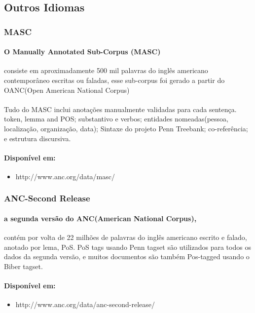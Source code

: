 \documentclass[a4paper, 10pt]{article}
\begin{document}
        \subsection{Outros Idiomas}
        	\subsubsection{MASC}
            	\paragraph{O Manually Annotated Sub-Corpus (MASC)}consiste em aproximadamente 500 mil palavras do inglês americano contemporâneo escritas ou faladas, esse sub-corpus foi gerado a partir do OANC(Open American National Corpus)
                \paragraph{}Tudo do MASC inclui anotações manualmente validadas para cada sentença. token, lemma and POS; substantivo e verbos; entidades nomeadas(pessoa, localização, organização, data); Sintaxe do projeto Penn Treebank; co-referência; e estrutura discursiva.
                
                \paragraph{Disponível em:}
                \begin{itemize}
                    \item http://www.anc.org/data/masc/
                \end{itemize}
            \subsubsection{ANC-Second Release}
            	\paragraph{a segunda versão do ANC(American National Corpus),}contém por volta de 22 milhões de palavras do inglês americano escrito e falado, anotado por lema, PoS. PoS tags usando Penn tagset são utilizados para todos os dados da segunda versão, e muitos documentos são também Pos-tagged usando o Biber tagset.
            	
            	\paragraph{Disponível em:}
                \begin{itemize}
                    \item http://www.anc.org/data/anc-second-release/
                \end{itemize}
\end{document}

